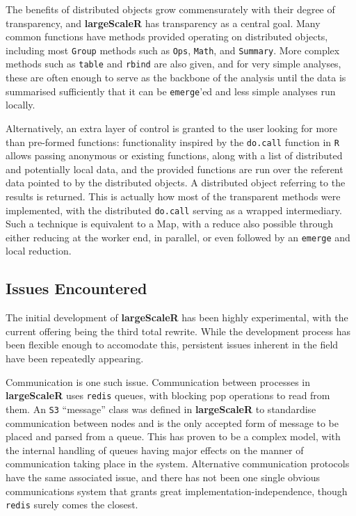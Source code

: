 The benefits of distributed objects grow commensurately with their degree of transparency, and \textbf{largeScaleR} has transparency as a central goal.
Many common functions have methods provided operating on distributed objects, including most \texttt{Group} methods such as \texttt{Ops}, \texttt{Math}, and \texttt{Summary}.
More complex methods such as \texttt{table} and \texttt{rbind} are also given, and for very simple analyses, these are often enough to serve as the backbone of the analysis until the data is summarised sufficiently that it can be \texttt{emerge}'ed and less simple analyses run locally.

Alternatively, an extra layer of control is granted to the user looking for more than pre-formed functions:
functionality inspired by the \texttt{do.call} function in \texttt{R} allows passing anonymous or existing functions, along with a list of distributed and potentially local data, and the provided functions are run over the referent data pointed to by the distributed objects.
A distributed object referring to the results is returned.
This is actually how most of the transparent methods were implemented, with the distributed \texttt{do.call} serving as a wrapped intermediary.
Such a technique is equivalent to a Map, with a reduce also possible through either reducing at the worker end, in parallel, or even followed by an \texttt{emerge} and local reduction\cite{mccool2012structured}.

\subsection{Issues Encountered}\label{sec:sys-imp}

The initial development of \textbf{largeScaleR} has been highly experimental, with the current offering being the third total rewrite.
While the development process has been flexible enough to accomodate this, persistent issues inherent in the field have been repeatedly appearing.

Communication is one such issue.
Communication between processes in \textbf{largeScaleR} uses \texttt{redis} queues, with blocking pop operations to read from them.
An \texttt{S3} ``message'' class was defined in \textbf{largeScaleR} to standardise communication between nodes and is the only accepted form of message to be placed and parsed from a queue.
This has proven to be a complex model, with the internal handling of queues having major effects on the manner of communication taking place in the system.
Alternative communication protocols have the same associated issue, and there has not been one single obvious communications system that grants great implementation-independence, though \texttt{redis} surely comes the closest\cite{sanfilippo2009redis}.

